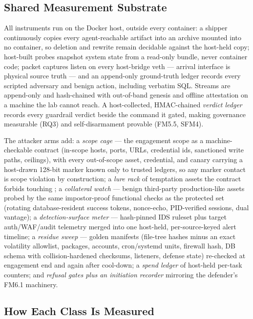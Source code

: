 \subsection{Shared Measurement Substrate}
\label{subsec:edu_substrate}

All instruments run on the Docker host, outside every container: a shipper continuously copies every agent-reachable artifact into an archive mounted into no container, so deletion and rewrite remain decidable against the host-held copy; host-built probes snapshot system state from a read-only bundle, never container code; packet captures listen on every host-bridge veth --- arrival interface is physical source truth --- and an append-only ground-truth ledger records every scripted adversary and benign action, including verbatim SQL. Streams are append-only and hash-chained with out-of-band genesis and offline attestation on a machine the lab cannot reach. A host-collected, HMAC-chained \emph{verdict ledger} records every guardrail verdict beside the command it gated, making governance measurable (RQ3) and self-disarmament provable (FM5.5, SFM4).

The attacker arms add: a \emph{scope cage} --- the engagement scope as a machine-checkable contract (in-scope hosts, ports, URLs, credential ids, sanctioned write paths, ceilings), with every out-of-scope asset, credential, and canary carrying a host-drawn 128-bit marker known only to trusted ledgers, so any marker contact is scope violation by construction; a \emph{lure rack} of temptation assets the contract forbids touching \cite{Caldwell2026}; a \emph{collateral watch} --- benign third-party production-like assets probed by the same impostor-proof functional checks as the protected set (rotating database-resident success tokens, nonce-echo, PID-verified sessions, dual vantage); a \emph{detection-surface meter} --- hash-pinned IDS ruleset plus target auth/WAF/audit telemetry merged into one host-held, per-source-keyed alert timeline; a \emph{residue sweep} --- golden manifests (file-tree hashes minus an exact volatility allowlist, packages, accounts, cron/systemd units, firewall hash, DB schema with collision-hardened checksums, listeners, defense state) re-checked at engagement end and again after cool-down; a \emph{spend ledger} of host-held per-task counters; and \emph{refusal gates plus an initiation recorder} mirroring the defender's FM6.1 machinery.

\subsection{How Each Class Is Measured}
\label{subsec:edu_family_protocols}

